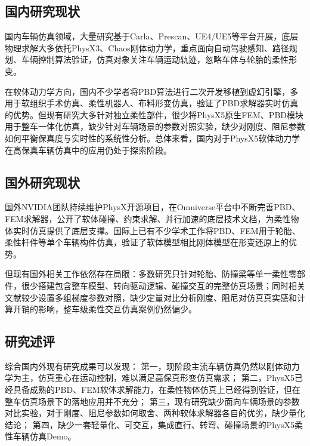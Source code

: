 \subsection{国内研究现状}
国内车辆仿真领域，大量研究基于Carla、Prescan、UE4/UE5等平台开展，底层物理求解大多依托PhysX3、Chaos刚体动力学，重点面向自动驾驶感知、路径规划、车辆控制算法验证，仿真对象关注车辆运动轨迹，忽略车体与轮胎的柔性形变\cite{dosovitskiy2017carla}。

在软体动力学方向，国内不少学者将PBD算法进行二次开发移植到虚幻引擎，多用于软组织手术仿真、柔性机器人、布料形变仿真，验证了PBD求解器实时仿真的优势。但现有研究大多针对独立柔性部件，很少将PhysX5原生FEM、PBD模块用于整车一体化仿真，缺少针对车辆场景的参数对照实验，缺少对刚度、阻尼参数如何平衡保真度与实时性的系统性分析。总体来看，国内对于PhysX5软体动力学在高保真车辆仿真中的应用仍处于探索阶段。

\subsection{国外研究现状}
国外NVIDIA团队持续维护PhysX开源项目，在Omniverse平台中不断完善PBD、FEM求解器，公开了软体碰撞、约束求解、并行加速的底层技术文档，为柔性物体实时仿真提供了底层支撑\cite{nvidia2020physx5}。国际上已有不少学术工作将PBD、FEM用于轮胎、柔性杆件等单个车辆构件仿真，验证了软体模型相比刚体模型在形变还原上的优势\cite{bouaziz2014projective}。

但现有国外相关工作依然存在局限：多数研究只针对轮胎、防撞梁等单一柔性零部件，很少搭建包含整车模型、转向驱动逻辑、碰撞交互的完整仿真场景；同时相关文献较少设置多组梯度参数对照，缺少定量对比分析刚度、阻尼对仿真真实感和计算开销的影响，整车级柔性交互仿真案例仍然偏少。

\subsection{研究述评}
综合国内外现有研究成果可以发现：
第一，现阶段主流车辆仿真仍然以刚体动力学为主，仿真重心在运动控制，难以满足高保真形变仿真需求；
第二，PhysX5已经具备成熟的PBD、FEM软体求解能力，在柔性物体仿真上已经得到验证，但在整车仿真场景下的落地应用并不充分；
第三，现有研究缺少面向车辆场景的参数对比实验，对于刚度、阻尼参数如何取舍、两种软体求解器各自的优劣，缺少量化结论；
第四，缺少一套轻量化、可交互，集成直行、转弯、碰撞场景的PhysX5柔性车辆仿真Demo。

